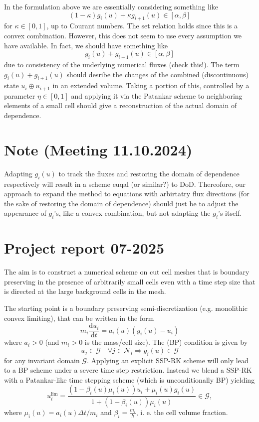 \documentclass[]{article}
\begin{document}
In the formulation above we are essentially considering something like
\begin{displaymath}
(1-\kappa)g_i(u) + \kappa g_{i+1}(u) \in [\alpha, \beta]
\end{displaymath}
for $\kappa \in [0, 1]$, up to Courant numbers. The set relation holds since this is a convex combination. However, this does not seem to use every assumption we have available. In fact, we should have something like
\begin{displaymath}
	g_i(u) + g_{i+1}(u) \in [\alpha, \beta]
\end{displaymath}
due to consistency of the underlying numerical fluxes (check this!). The term $g_i(u) + g_{i+1}(u)$ should desribe  the changes of the combined (discontinuous) state $u_i \oplus u_{i+1}$ in an extended volume. Taking a portion of this, controlled by a parameter $\eta \in [0, 1]$ and applying it via the Patankar scheme to neighboring elements of a small cell should give a reconstruction of the actual domain of dependence.

\section{Note (Meeting 11.10.2024)}
Adapting $g_i(u)$ to track the fluxes and restoring the domain of dependence respectively will result in a scheme euqal (or similar?) to DoD. 
Thereofore, our approach to expand the method to equations with arbirtatry flux directions (for the sake of restoring the domain of dependence) should just be to adjust the appearance of $g_i$'s, like a convex combination, but not adapting the $g_i$'s itself.

\newpage

\section{Project report 07-2025}
The aim is to construct a numerical scheme on cut cell meshes that is boundary preserving in the presence of arbitrarily small cells even with a time step size that is directed at the large background cells in the mesh.

The starting point is a boundary preserving semi-discretization (e.g. monolithic convex limiting), that can be written in the form
\begin{equation}
	\label{eq: semidiscretization}
m_i \frac{\text{d}u_i}{\text{d}t}=a_i(u)\left(g_i(u)-u_i\right)
\end{equation}
where $a_i>0$ (and $m_i>0$ is the mass/cell size). The (BP) condition is given by $$u_j\in \mathcal{G} \quad \forall j \in \mathcal{N}_i \Rightarrow g_i(u)\in \mathcal{G}$$ for any invariant domain $\mathcal{G}$. Applying an explicit SSP-RK scheme will only lead to a BP scheme under a severe time step restriction. Instead we blend a SSP-RK with a Patankar-like time stepping scheme (which is unconditionally BP) yielding
$$u_i^{\text{lim}} = \frac{(1-\beta_i(u)\mu_i(u))u_i+\mu_i(u)g_i(u)}{1+(1-\beta_i(u))\mu_i(u)} \in \mathcal{G},$$
where $\mu_i(u) = a_i(u)\Delta t/m_i$  and $\beta_i = \frac{m_i}{h}$, i. e. the cell volume fraction.
\end{document}
